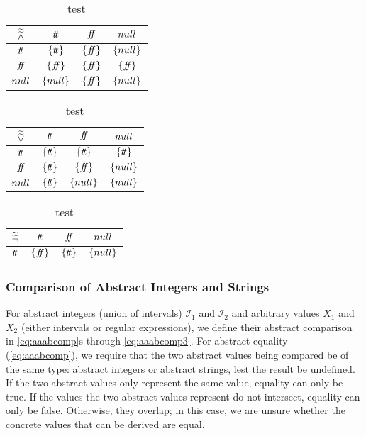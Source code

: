 \begin{table}[H]
    \centering
    \caption{test}
    \begin{tabular}{c|ccc}
        $\widetilde{\widetilde{\land}}$ & $t\!t$ & $f\!\!f$ & $null$ \\
        \hline
        $t\!t$ & $\{t\!t\}$ & $\{f\!\!f\}$ & $\{null\}$ \\
        $f\!\!f$ & $\{f\!\!f\}$ & $\{f\!\!f\}$ & $\{f\!\!f\}$ \\
        $null$ & $\{null\}$ & $\{f\!\!f\}$ & $\{null\}$ \\
    \end{tabular}
    \label{tab:aaabland}
\end{table}

\begin{table}[H]
    \centering
    \caption{test}
    \begin{tabular}{c|ccc}
        $\widetilde{\widetilde{\lor}}$ & $t\!t$ & $f\!\!f$ & $null$ \\
        \hline
        $t\!t$ & $\{t\!t\}$ & $\{t\!t\}$ & $\{t\!t\}$ \\
        $f\!\!f$ & $\{t\!t\}$ & $\{f\!\!f\}$ & $\{null\}$ \\
        $null$ & $\{t\!t\}$ & $\{null\}$ & $\{null\}$ \\
    \end{tabular}
    \label{tab:aaablor}
\end{table}

\begin{table}[H]
    \centering
    \caption{test}
    \begin{tabular}{c|ccc}
        $\widetilde{\widetilde{\neg}}$ & $t\!t$ & $f\!\!f$ & $null$ \\
        \hline
        $t\!t$ & $\{f\!\!f\}$ & $\{t\!t\}$ & $\{null\}$ \\
    \end{tabular}
    \label{tab:aaabneg}
\end{table}

\subsubsection{Comparison of Abstract Integers and Strings}\label{subsubsec:abstract-comparison}
For abstract integers (union of intervals) $\mathscr{I}_1$ and $\mathscr{I}_2$ and arbitrary values $X_1$ and $X_2$ (either intervals or regular expressions), we define their abstract comparison in \autoref{eq:aaabcomp}s through \ref{eq:aaabcomp3}.
For abstract equality (\autoref{eq:aaabcomp}), we require that the two abstract values being compared be of the same type: abstract integers or abstract strings, lest the result be undefined.
If the two abstract values only represent the same value, equality can only be true.
If the values the two abstract values represent do not intersect, equality can only be false.
Otherwise, they overlap; in this case, we are unsure whether the concrete values that can be derived are equal.

